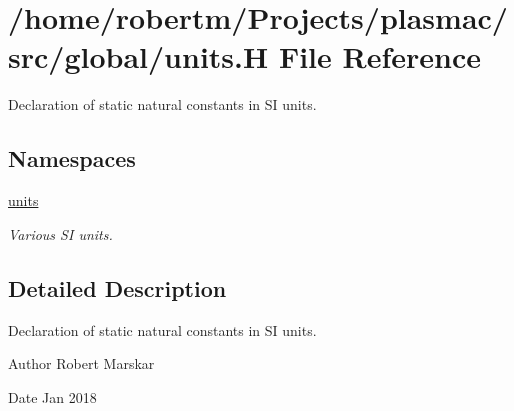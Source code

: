 \hypertarget{units_8H}{}\section{/home/robertm/\+Projects/plasmac/src/global/units.H File Reference}
\label{units_8H}


Declaration of static natural constants in SI units.  


\subsection*{Namespaces}
\begin{DoxyCompactItemize}
\item 
 \hyperlink{namespaceunits}{units}
\begin{DoxyCompactList}\small\item\em Various SI units. \end{DoxyCompactList}\end{DoxyCompactItemize}


\subsection{Detailed Description}
Declaration of static natural constants in SI units. 

\begin{DoxyAuthor}{Author}
Robert Marskar 
\end{DoxyAuthor}
\begin{DoxyDate}{Date}
Jan 2018 
\end{DoxyDate}
